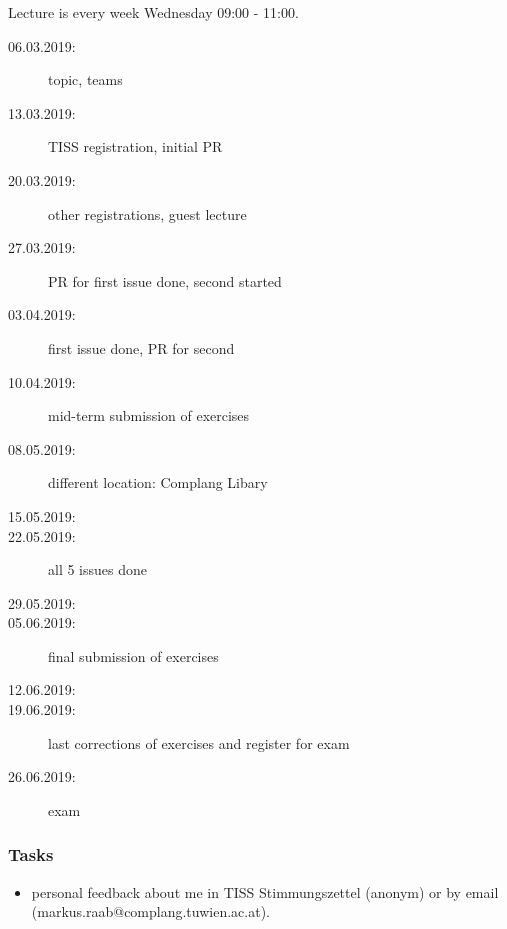 


\date{12.06.2019}



\renewcommand{\enquote}[1]{\emph{``#1''}} %

\begin{frame}
	\titlepage
	\doclicenseThis
\end{frame}

\begin{frame}
	Lecture is every week Wednesday 09:00 - 11:00.

	\begin{description}
		\item[06.03.2019:] {\color{gray}topic, teams}
		\item[13.03.2019:] {\color{gray}TISS registration, initial PR}
		\item[20.03.2019:] {\color{gray}other registrations, guest lecture}
		\item[27.03.2019:] {\color{gray}PR for first issue done, second started}
		\item[03.04.2019:] {\color{gray}first issue done, PR for second}
		\item[10.04.2019:] {\color{gray}mid-term submission of exercises}
		\item[08.05.2019:] {\color{gray}different location: Complang Libary}
		\item[15.05.2019:]
		\item[22.05.2019:] {\color{gray}all 5 issues done}
		\item[29.05.2019:]
		\item[05.06.2019:] {\color{gray}final submission of exercises}
		\item[12.06.2019:]
		\item[19.06.2019:] last corrections of exercises and register for exam
		\item[26.06.2019:] exam
	\end{description}
\end{frame}

\begin{assignment}
	\frametitle{Tasks}

	\begin{task}
	\begin{itemize}[<+-| alert@+>]
	\item personal feedback about me in TISS Stimmungszettel (anonym) or by email (markus.raab@complang.tuwien.ac.at).
	\end{itemize}
	\end{task}
\end{assignment}

